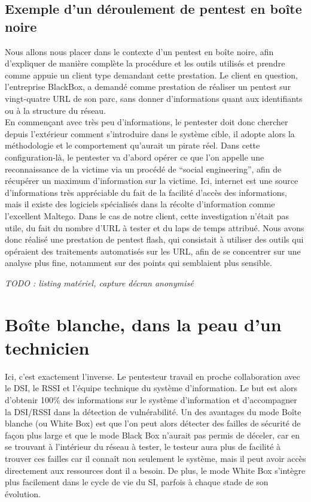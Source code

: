 \documentclass[a4paper]{memoir}
\begin{document}
\subsection{Exemple d'un déroulement de pentest en boîte noire}

Nous allons nous placer dans le contexte d'un pentest en boîte noire, afin d'expliquer de manière complète la procédure et les outils utilisés et prendre comme appuie un client type demandant cette prestation. Le client en question, l'entreprise BlackBox, a demandé comme prestation de réaliser un pentest sur vingt-quatre URL de son parc, sans donner d'informations quant aux identifiants ou à la structure du réseau.\\

En commençant avec très peu d’informations, le pentester doit donc chercher depuis l’extérieur comment s’introduire dans le système cible, il adopte alors la méthodologie et le comportement qu’aurait un pirate réel. 
Dans cette configuration-là, le pentester va d'abord opérer ce que l'on appelle une reconnaissance de la victime via un procédé de ``social engineering'', afin de récupérer un maximum d'information sur la victime. Ici, internet est une source d'informations très appréciable du fait de la facilité d'accès des informations, mais il existe des logiciels spécialisés dans la récolte d'information comme l'excellent Maltego.
Dans le cas de notre client, cette investigation n'était pas utile, du fait du nombre d'URL à tester et du laps de temps attribué. Nous avons donc réalisé une prestation de pentest flash, qui consistait à utiliser des outils qui opéraient des traitements automatisés sur les URL, afin de se concentrer sur une analyse plus fine, notamment sur des points qui semblaient plus sensible.

\textit{TODO : listing matériel, capture décran anonymisé}   



\section{Boîte blanche, dans la peau d'un technicien}

 Ici, c’est exactement l’inverse. Le pentesteur travail en proche collaboration avec le DSI, le RSSI et l’équipe technique du système d’information. Le but est alors d’obtenir 100\% des informations sur le système d’information et d’accompagner la DSI/RSSI dans la détection de vulnérabilité. Un des avantages du mode Boîte blanche (ou White Box) est que l’on peut alors détecter des failles de sécurité de façon plus large et que le mode Black Box n’aurait pas permis de déceler, car en se trouvant à l'intérieur du réseau à tester, le testeur aura plus de facilité à trouver ces failles car il connaît non seulement le système, mais il peut avoir accès directement aux ressources dont il a besoin. De plus, le mode White Box s’intègre plus facilement dans le cycle de vie du SI, parfois à chaque stade de son évolution. 
\end{document}
